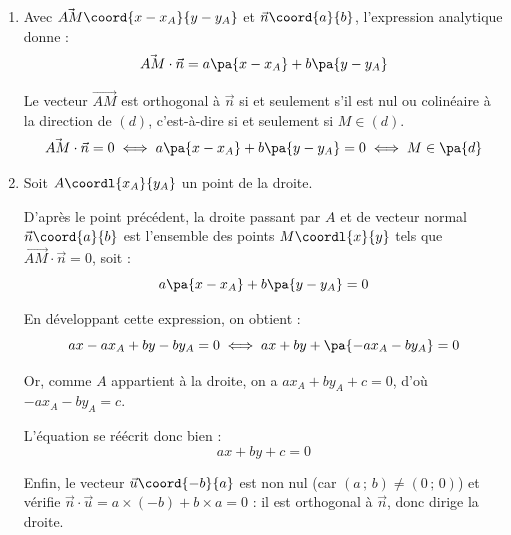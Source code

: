 \begin{demonstration}
	\nline
	\begin{enumerate}
		\item Avec $\vec{AM}\coord{x - x_A}{y - y_A}$ et $\vec{n}\coord{a}{b}$, l'expression analytique donne :
		      \[
			      \vec{AM} \cdot \vec{n} = a\pa{x - x_A} + b\pa{y - y_A}
		      \]

		      Le vecteur $\vec{AM}$ est orthogonal à $\vec{n}$ si et seulement s'il est nul ou colinéaire à la direction de $(d)$, c'est-à-dire si et seulement si $M \in (d)$.
		      \[
			      \vec{AM} \cdot \vec{n} =0 \iff a\pa{x - x_A} + b\pa{y - y_A}=0 \iff M\in\pa{d}
		      \]

		\item Soit $A\coordl{x_A}{y_A}$ un point de la droite.

		      D'après le point précédent, la droite passant par $A$ et de vecteur normal $\vec{n}\coord{a}{b}$ est l'ensemble des points $M\coordl{x}{y}$ tels que $\vec{AM} \cdot \vec{n} = 0$, soit :
		      \[
			      a\pa{x - x_A} + b\pa{y - y_A} = 0
		      \]

		      En développant cette expression, on obtient :
		      \[
			      ax - ax_A + by - by_A = 0 \iff ax + by + \pa{-ax_A - by_A} = 0
		      \]

		      Or, comme $A$ appartient à la droite, on a $ax_A + by_A + c = 0$, d'où $-ax_A - by_A = c$.

		      L'équation se réécrit donc bien :
		      \[
			      ax + by + c = 0
		      \]

		      Enfin, le vecteur $\vec{u}\coord{-b}{a}$ est non nul (car $(a\,;\,b) \neq (0\,;\,0)$) et vérifie $\vec{n} \cdot \vec{u} = a\times(-b) + b\times a = 0$ : il est orthogonal à $\vec{n}$, donc dirige la droite.
	\end{enumerate}
\end{demonstration}

\newpage

